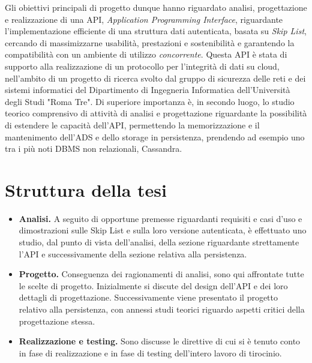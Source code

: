 		Gli obiettivi principali di progetto dunque hanno riguardato analisi, progettazione e realizzazione di una API, \textit{Application Programming Interface}, riguardante l'implementazione efficiente di una struttura dati autenticata, basata su \textit{Skip List}, cercando di massimizzarne usabilità, prestazioni e sostenibilità e garantendo la compatibilità con un ambiente di utilizzo \textit{concorrente}. Questa API è stata di supporto alla realizzazione di un protocollo per l'integrità di dati su cloud, nell'ambito di un progetto di ricerca svolto dal gruppo di sicurezza delle reti e dei sistemi informatici del Dipartimento di Ingegneria Informatica dell'Università degli Studi "Roma Tre". Di superiore importanza è, in secondo luogo, lo studio teorico comprensivo di attività di analisi e progettazione riguardante la possibilità di estendere le capacità dell'API, permettendo la memorizzazione e il mantenimento dell'ADS e dello storage in persistenza, prendendo ad esempio uno tra i più noti DBMS non relazionali, Cassandra.

\section{Struttura della tesi}
	

		\begin{itemize}
			\item \textbf{Analisi.} A seguito di opportune premesse riguardanti requisiti e casi d'uso e dimostrazioni sulle Skip List e sulla loro versione autenticata, è effettuato uno studio, dal punto di vista dell'analisi, della sezione riguardante strettamente l'API e successivamente della sezione relativa alla persistenza.
			\item \textbf{Progetto.} Conseguenza dei ragionamenti di analisi, sono qui affrontate tutte le scelte di progetto. Inizialmente si discute del design dell'API e dei loro dettagli di progettazione. Successivamente viene presentato il progetto relativo alla persistenza, con annessi studi teorici riguardo aspetti critici della progettazione stessa.
			\item \textbf{Realizzazione e testing.} Sono discusse le direttive di cui si è tenuto conto in fase di realizzazione e in fase di testing dell'intero lavoro di tirocinio.			
		\end{itemize}